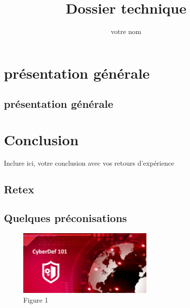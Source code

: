 \documentclass[11pt,fleqn,twoside]{article}
\author{votre nom}
\title{Dossier technique}
\begin{document}
\maketitle
\uelogo


\section{présentation générale}
\subsection{présentation générale}
\section{Conclusion}

Inclure ici, votre conclusion avec vos retours d'expérience

\subsection{Retex}
\subsection{Quelques préconisations}


\begin{figure}[h!]
\begin{center}
	\includegraphics[width =0.6\textwidth, keepaspectratio]{images/image-test}
	\caption{Figure 1}\label{mon image}
	\end{center}
\end{figure}
\end{document}
